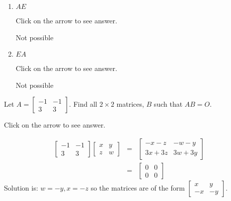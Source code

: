 \documentclass{ximera}
\begin{document}
\begin{problem}
\begin{enumerate}
\item $AE$

Click on the arrow to see answer.
\begin{expandable}
Not possible
\end{expandable}

\item $EA$

Click on the arrow to see answer.
\begin{expandable}
Not possible
\end{expandable}

\end{enumerate}
\end{problem}


\begin{problem}\label{prb:4.12} Let $A=\left[
\begin{array}{rr}
-1 & -1 \\
3 & 3
\end{array}
\right] $. Find all $2\times 2$ matrices, $B$
such that $AB=O.$

Click on the arrow to see answer.
\begin{expandable}
\begin{eqnarray*}
\left[
\begin{array}{rr}
-1 & -1 \\
3 & 3
\end{array}
\right] \left[
\begin{array}{cc}
x & y \\
z & w
\end{array}
\right]  &=&\left[
\begin{array}{cc}
-x-z & -w-y \\
3x+3z & 3w+3y
\end{array}
\right]  \\
&=&\left[
\begin{array}{cc}
0 & 0 \\
0 & 0
\end{array}
\right]
\end{eqnarray*}
Solution is: $ w=-y,x=-z $ so the
matrices are of the form $\left[
\begin{array}{rr}
x & y \\
-x & -y
\end{array}
\right].$
\end{expandable}
\end{problem}
\end{document}
